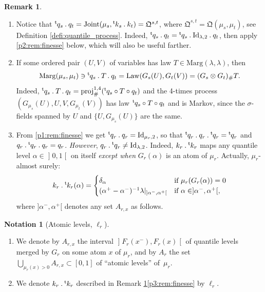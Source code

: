 \documentclass[10pt,a4paper]{article}
\newcommand{\ldot}{\mathbin{.}}
\theoremstyle{plain}
\theoremstyle{definition}
\newtheorem{notation}[them]{Notation} %
\newtheorem{rem}[them]{Remark}
\newcommand{\id}{\mathrm{Id}}
\newcommand{\join}{\mathrm{Joint}}
\newcommand{\como}{\mathfrak{Q}}
\newcommand{\trans}{{}^{\mathrm{t}}\mkern-1mu}
\newcommand{\la}{\lambda}
\newcommand{\ma}{\mathrm{Marg}}
\newcommand{\law}{\operatorname{Law}}
\newcommand{\pr}{\operatorname{proj}}
\newcommand{\op}{\mathopen}
\newcommand{\clo}{\mathclose}
\begin{document}
\begin{rem}\label{rem:finesse}
\begin{enumerate}
\item
\label{p1:rem:finesse} Notice that $\trans{q}_s \ldot q_t=\join(\mu_s,\trans{k}_s \ldot k_t)=\como^{s,t}$, where $\como^{s,t}=\como(\mu_s,\mu_t)$, see Definition \ref{defi:quantile_process}. Indeed, $\trans{q}_s \ldot q_t=\trans{q}_s \ldot\id_{\la,2}{}\ldot q_t$, then apply \eqref{p2:rem:finesse} below,
which will also be useful farther.

\item
\label{p2:rem:finesse} If some ordered pair $(U,V)$ of variables has law $T\in \ma(\la,\la)$, then\vspace*{-3pt}
\[
\ma(\mu_s,\mu_t)\ni\trans{q}_s \ldot T\ldot q_t=\law(G_s(U),G_t(V))=(G_s\otimes G_t)_\#T.
\]
Indeed, $\trans{q}_s \ldot T\ldot q_t=\pr^{1,4}_\#(\trans{q}_s \circ T\circ q_t)$ and the 4-times process $(G_{\mu_s}(U),U,V,G_{\mu_t}(V))$ has law $\trans{q}_s \circ T\circ q_t$ and is Markov, since the $\sigma$-fields spanned by $U$ and $\{U,G_{\mu_s}(U)\}$ are the same.

\item
\label{p3:rem:finesse} From \eqref{p1:rem:finesse} we get $\trans q_r\ldot q_r=\id_{\mu_r,2}$, so that $\trans q_r\ldot q_r\ldot\trans q_r=\trans q_r$ and $q_r\ldot\trans q_r\ldot q_r=q_r$. \emph{However}, $q_r\ldot\trans q_r\neq \id_{\la,2}$. Indeed, $k_r\ldot\trans{k}_r$ maps any quantile level $\alpha\in \op]0,1\clo[$ on itself \emph{except when} $G_r(\alpha)$ is an atom of $\mu_r$. Actually, $\mu_r$-almost surely:\vspace*{-3pt}
\begin{align*}
k_r\ldot\trans{k}_r(\alpha)=
\begin{cases}
\delta_\alpha&\text{if }\mu_r(G_{r}(\alpha))=0\\
(\alpha^+-\alpha^-)^{-1}\la|_{]\alpha^-,\alpha^+[}&\text{if }\alpha\in]\alpha^-,\alpha^+[,
\end{cases}
\end{align*}
where $]\alpha^-,\alpha^+[$ denotes any set $A_{r,x}$ as follows.
\end{enumerate}
\end{rem}

\begin{notation}[Atomic levels, $\ell_r$]\label{nota:Asx}
\begin{enumerate}
\item
\label{p:Asx} We denote by $A_{r,x}$ the interval $\op]F_r(x^-),F_r(x)\clo[$ of quantile levels merged by $G_r$ on some atom $x$ of $\mu_r$, and by $A_r$ the set $\bigcup_{\mu_r(x)>0}A_{r,x}\!\subset\! [0,1]$ of ``atomic levels'' of~$\mu_r$.

\item
\label{p:l_R_fini} We denote $k_r\ldot\trans{k}_r$ described in Remark \ref{rem:finesse}\eqref{p3:rem:finesse} by $\ell_r$.
\end{enumerate}
\end{notation}
\end{document}

